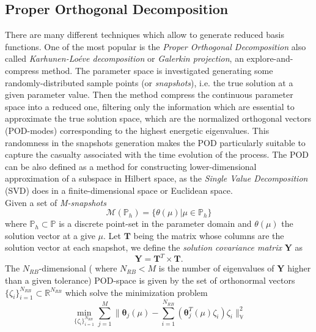 \documentclass[3p]{article}
\begin{document}
\subsection*{Proper Orthogonal Decomposition}
There are many different techniques which allow to generate reduced basis functions. One of the most popular is the \textit{Proper Orthogonal Decomposition} also called \textit{Karhunen-Lo{\'e}ve decomposition} or \textit{Galerkin projection}, an explore-and-compress method. The parameter space is investigated generating some randomly-distributed sample points (or \textit{snapshots}), i.e. the true solution at a given parameter value. Then the method compress the continuous parameter space into a reduced one, filtering only the information which are essential to approximate the true solution space, which are the normalized orthogonal vectors (POD-modes) corresponding to the highest energetic eigenvalues. This randomness in the snapshots generation makes the POD particularly suitable to capture the casualty associated with the time evolution of the process. The POD can be also defined as a method for constructing lower-dimensional approximation of a subspace in Hilbert space, as the \textit{Single Value Decomposition} (SVD) does in a finite-dimensional space or Euclidean space.\\Given a set of \textit{M-snapshots} 
\begin{equation}
\mathcal{M}(\mathbb{P}_{h}) = \lbrace\theta(\mu)\vert\mu \in \mathbb{P}_{h}\rbrace
\end{equation}
where $\mathbb{P}_{h} \subset \mathbb{P}$ is a discrete point-set in the parameter domain and $\theta(\mu)$ the solution vector at a give $\mu$. Let $\mathbf{T}$ being the matrix whose columns are the solution vector at each snapshot, we define the \textit{solution covariance matrix} $\mathbf{Y}$ as
\begin{equation}
\mathbf{Y} = \mathbf{T}^{T} \times \mathbf{T}.
\label{eq:covarianceMatrix}
\end{equation}
The $N_{RB}$-dimensional ( where $N_{RB} < M$ is the number of eigenvalues of $\mathbf{Y}$ higher than a given tolerance) POD-space is given by the set of orthonormal vectors $\lbrace \zeta_{i} \rbrace_{i=1}^{N_{RB}} \subset \mathbb{R}^{N_{RB}}$ which solve the minimization problem \\
\indent
\begin{equation}
\min_{\lbrace\zeta_{i}\rbrace_{i=1}^{N_{RB}}}\sum_{j=1}^{M} 
\| \mathbold{\theta}_{j}(\mu) - \sum_{i=1}^{N_{RB}}(\mathbold{\theta}_{j}^{T}(\mu)\zeta_{i})\zeta_i\|_{\mathbb{V}}^{2}
\label{eq:minPOD}
\end{equation}
\end{document}
